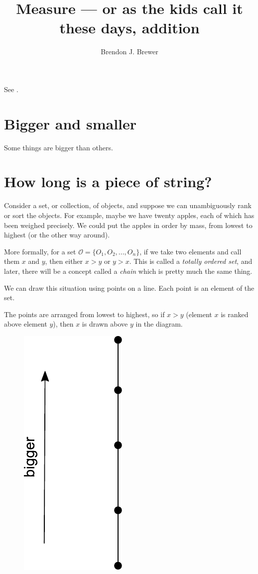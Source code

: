 \documentclass[a4paper, 12pt]{article}
\title{Measure --- or as the kids call it these days, addition}
\author{Brendon J. Brewer}
\date{}
\begin{document}
\maketitle

\setlength{\parindent}{0pt}
\setlength{\parskip}{8pt}

See \citet{knuth2016deeper}.

\section{Bigger and smaller}
Some things are bigger than others.

\section{How long is a piece of string?}

Consider a set, or collection, of objects, and suppose we can
unambiguously rank or sort the objects. For example, maybe we
have twenty apples, each of which has been weighed precisely.
We could put the apples in order by mass, from lowest to highest (or
the other way around).

More formally, for a set $\mathcal{O} = \{O_1, O_2, ..., O_n\}$,
if we take two elements
and call them $x$ and $y$, then either $x > y$ or $y > x$.
This is called a {\em totally ordered set}, and later, there
will be a concept called a {\em chain} which is pretty much
the same thing.

We can draw this situation using points on a line. Each point
is an element of the set.

The points are arranged from lowest to highest, so if $x > y$ (element
$x$ is ranked above element $y$), then $x$ is drawn above $y$ in the
diagram.


\begin{figure}[!ht]
\centering
\includegraphics[scale=0.6]{figures/totally_ordered_set.pdf}
\caption{\label{fig:totally_ordered_set}}
\end{figure}
\end{document}
